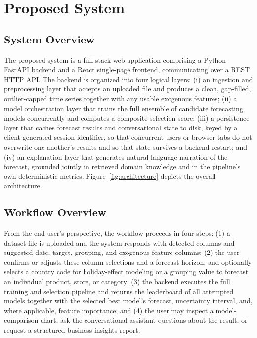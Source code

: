 \section{Proposed System}
\label{sec:proposed}

\subsection{System Overview}
The proposed system is a full-stack web application comprising a Python FastAPI backend and a React single-page frontend, communicating over a REST HTTP API. The backend is organized into four logical layers: (i) an ingestion and preprocessing layer that accepts an uploaded file and produces a clean, gap-filled, outlier-capped time series together with any usable exogenous features; (ii) a model orchestration layer that trains the full ensemble of candidate forecasting models concurrently and computes a composite selection score; (iii) a persistence layer that caches forecast results and conversational state to disk, keyed by a client-generated session identifier, so that concurrent users or browser tabs do not overwrite one another's results and so that state survives a backend restart; and (iv) an explanation layer that generates natural-language narration of the forecast, grounded jointly in retrieved domain knowledge and in the pipeline's own deterministic metrics. Figure~\ref{fig:architecture} depicts the overall architecture.

\subsection{Workflow Overview}
From the end user's perspective, the workflow proceeds in four steps: (1) a dataset file is uploaded and the system responds with detected columns and suggested date, target, grouping, and exogenous-feature columns; (2) the user confirms or adjusts these column selections and a forecast horizon, and optionally selects a country code for holiday-effect modeling or a grouping value to forecast an individual product, store, or category; (3) the backend executes the full training and selection pipeline and returns the leaderboard of all attempted models together with the selected best model's forecast, uncertainty interval, and, where applicable, feature importance; and (4) the user may inspect a model-comparison chart, ask the conversational assistant questions about the result, or request a structured business insights report.

